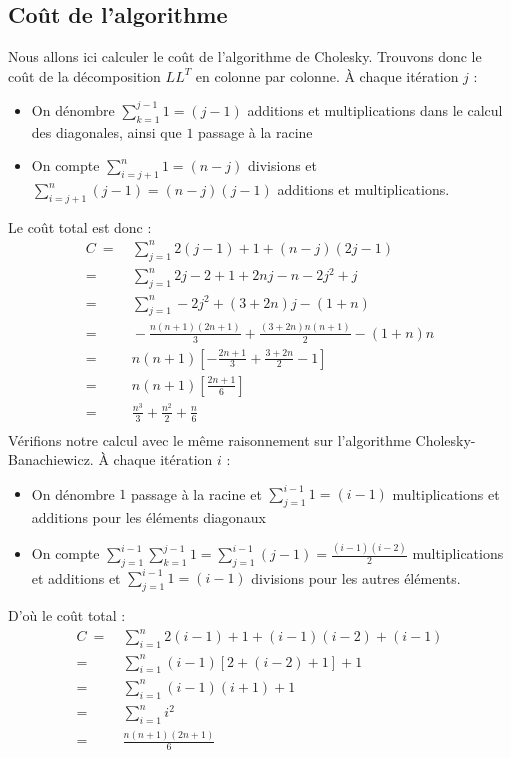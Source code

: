 \documentclass[a4paper, titlepage]{livret}													%
\begin{document}
		\subsection{Coût de l'algorithme}
			Nous allons ici calculer le coût de l'algorithme de Cholesky.
			Trouvons donc le coût de la décomposition $LL^{T}$ en colonne par colonne.
			À chaque itération $j$ :
			\begin{itemize}
				\item On dénombre $\sum_{k = 1}^{j - 1} 1 = (j - 1)$ additions et multiplications dans le calcul des diagonales, ainsi que $1$ passage à la racine
				\item On compte $\sum_{i = j + 1}^{n} 1 = (n - j)$ divisions et $\sum_{i = j + 1}^{n} (j - 1) = (n - j)(j - 1)$ additions et multiplications.
			\end{itemize}
			Le coût total est donc :
				\begin{align*}
					C \ = & 
					\ \sum_{j = 1}^{n} 2(j - 1) + 1 + (n - j)(2j - 1) \\
					= & 
					\ \sum_{j = 1}^{n} 2j - 2 + 1 + 2nj - n -2j^{2} + j \\
					= &
					\ \sum_{j = 1}^{n} -2j^{2} + (3 + 2n)j - (1 + n) \\
					= & 
					\  -\frac{n(n+1)(2n + 1)}{3} + \frac{(3 + 2n)n(n+1)}{2} - (1 + n)n \\
					= & 
					\  n(n + 1)[-\frac{2n + 1}{3} + \frac{3 + 2n}{2} - 1] \\
					= & 
					\  n(n + 1)[\frac{2n + 1}{6}] \\
					= & 
					\  \frac{n^{3}}{3} + \frac{n^{2}}{2} + \frac{n}{6} \\
				\end{align*}
			Vérifions notre calcul avec le même raisonnement sur l'algorithme Cholesky-Banachiewicz.
			À chaque itération $i$ :
			\begin{itemize}
				\item On dénombre $1$ passage à la racine et $\sum_{j = 1}^{i - 1} 1 = (i - 1)$ multiplications et additions pour les éléments diagonaux
				\item On compte $\sum_{j = 1}^{i - 1} \sum_{k = 1}^{j - 1} 1 = \sum_{j = 1}^{i - 1} (j - 1) = \frac{(i - 1)(i - 2)}{2}$ multiplications et additions et $\sum_{j = 1}^{i - 1} 1 = (i - 1)$ divisions pour les autres éléments.
			\end{itemize}
			D'où le coût total :
				\begin{align*}
					C \ = & 
					\ \sum_{i = 1}^{n} 2(i - 1) + 1 + (i - 1)(i - 2) + (i - 1) \\
					= & 
					\ \sum_{i = 1}^{n} (i - 1)[2 + (i - 2) + 1] + 1 \\
					= &
					\ \sum_{i = 1}^{n} (i - 1)(i + 1) + 1 \\
					= & 
					\  \sum_{i = 1}^{n} i^{2} \\
					= & 
					\  \frac{n(n + 1)(2n + 1)}{6} \\
				\end{align*}
\end{document}
